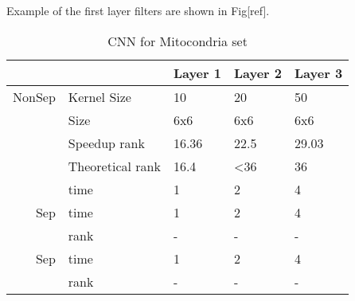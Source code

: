 Example of the first layer filters are shown in Fig[ref]. 

\begin{table}
\centering
\begin{tabular}{@{}rllll@{}}\toprule
 &&Layer 1& Layer 2 & Layer 3\\ \midrule
NonSep &Kernel Size & 10 & 20& 50\\
&Size & 6x6 & 6x6& 6x6\\
&Speedup rank& 16.36 & 22.5 & 29.03\\
&Theoretical rank & 16.4 & <36 & 36 \\ 
&time & 1 & 2 & 4 \\ \midrule
Sep& time & 1 & 2 & 4 \\ 
& rank& - & - & -\\ \midrule
Sep& time & 1 & 2 & 4 \\ 
& rank& - & - & -\\ \bottomrule
\end{tabular}
\caption{CNN for Mitocondria set}
\label{fig:CNN3}
\end{table}
